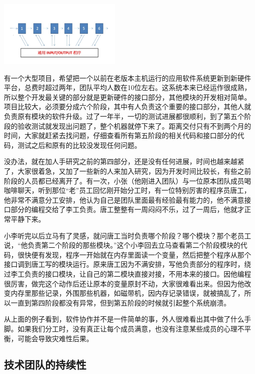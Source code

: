\includegraphics[width=6cm]{TC6stagesNioScreenshot_2022-10-27_192322.jpg}

有一个大型项目，希望把一个以前在老版本主机运行的应用软件系统更新到新硬件平台，总费时超过两年，团队平均人数在10位左右。这系统本来已经运作很成熟，所以整个开发最关键的部分就是更新硬件的接口部分，其他模块的开发相对简单。项目比较大，必须要分成六个阶段，其中有人负责这个重要的接口部分，其他人就负责原有模块的软件升级。过了一年半，一切的测试进展都很顺利，到了第五个阶段的验收测试就发现出问题了，整个机器就停下来了。距离交付只有不到两个月的时间，大家就赶紧去找问题，仔细查看所有第五阶段的相关代码和接口部分的代码，测试之后和原有的比较没发现任何问题。

没办法，就在加人手研究之前的第四部分，还是没有任何进展，时间也越来越紧了，大家很着急，又加了一些新的人来加入研究，因为开发时间比较长，有些之前阶段的人员都已经离开了。有一次，小张（他刚进入团队）与一位原本团队成员喝咖啡聊天，听到那位``老''员工回忆刚开始分工时，有一位特别厉害的程序员唐工，他非常不满意分工安排，他认为自己是团队里面最有经验最有能力的，他不满意接口部分的编程交给了李工负责。唐工整整有一周闷闷不乐，过了一周后，他就才正常平静下来。

小李听完以后立马有了灵感，就问唐工当时负责哪个阶段？哪个模块？那个老员工说，``他负责第二个阶段的那些模块。''这个小李回去立马查看第二个阶段模块的代码，很快便有发现，程序一开始就在内存里面读一个变量，然后把整个程序从那个接口调到唐工写的模块运行。原来唐工因为不满安排，写他负责部分的程序时，绕过李工负责的接口模块，让自己的第二模块直接对接，不用本来的接口。因他编程很厉害，做完这个动作后还让原本的变量原封不动，大家很难看出来。但因为他改变内存里那些记录，外围那些机器，如磁带机，因内存记录错误，就被搞乱了，所以一直到第四阶段都没有异常，但到第五阶段的时候就引起整个系统崩溃。

从上面的例子看到，软件协作并不是一件简单的事，外人很难看出其中做了什么手脚。如果我们分工时，没有真正让每个成员满意，也没有注意某些成员的心理不平衡，可能会导致灾难性后果。

\hypertarget{ux6280ux672fux56e2ux961fux7684ux6301ux7eedux6027}{%
\subsection{技术团队的持续性}\label{ux6280ux672fux56e2ux961fux7684ux6301ux7eedux6027}}

